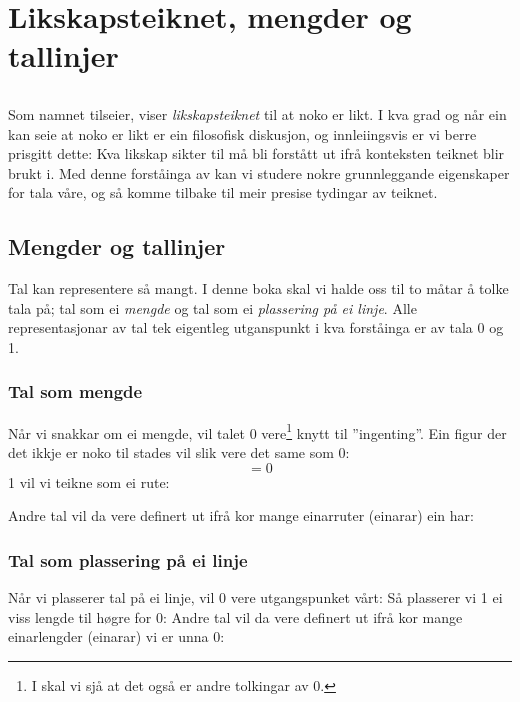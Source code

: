 



\newpage
\section{Likskapsteiknet, mengder og tallinjer}
\subsection*{\likteikn}
Som namnet tilseier, viser \textit{likskapsteiknet}  \sym{$ = $} til at noko er likt. I kva grad og når ein kan seie at noko er likt er ein filosofisk diskusjon, og innleiingsvis er vi berre prisgitt dette: Kva likskap \sym{$=$} sikter til må bli forstått ut ifrå konteksten teiknet blir brukt i. Med denne forståinga av \sym{=} kan vi studere nokre grunnleggande eigenskaper for tala våre, og så komme tilbake til meir presise tydingar av teiknet. \regv
{}
\subsection*{Mengder og tallinjer}
Tal kan representere så mangt. I denne boka skal vi halde oss til to måtar å tolke tala på; tal som ei \textsl{mengde} og tal som ei \textsl{plassering på ei linje}. Alle representasjonar av tal tek eigentleg utganspunkt i kva forståinga er av tala 0 og 1.

\subsubsection*{Tal som mengde}
	Når vi snakkar om ei mengde, vil talet 0 vere\footnote{I  skal vi sjå at det også er andre tolkingar av 0.} knytt til ''ingenting''. Ein figur der det ikkje er noko til stades vil slik vere det same som 0:
	\[ =0 \]
	1 vil vi teikne som ei rute:

Andre tal vil da vere definert ut ifrå kor mange einarruter (einarar) ein har:
\newpage	
\subsubsection*{Tal som plassering på ei linje}
	Når vi plasserer tal på ei linje, vil 0 vere utgangspunket vårt:
	Så plasserer vi 1 ei viss lengde til høgre for 0:
	Andre tal vil da vere definert ut ifrå kor mange einarlengder (einarar) vi er unna 0:
